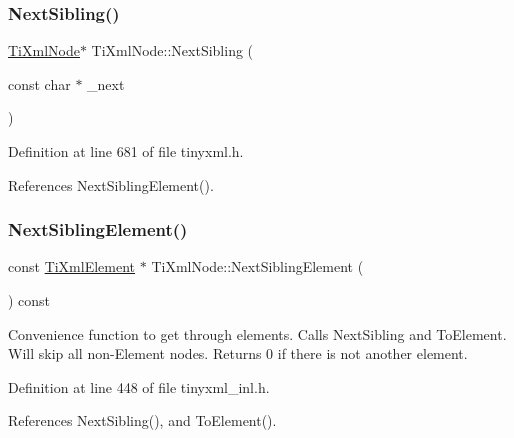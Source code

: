 \hypertarget{class_ti_xml_node_a4080bc5cc8a5c139e7cf308669e850fc}{}\label{class_ti_xml_node_a4080bc5cc8a5c139e7cf308669e850fc} 
\subsubsection{\texorpdfstring{Next\+Sibling()}{NextSibling()}\hspace{0.1cm}{\footnotesize\ttfamily [6/6]}}
{\footnotesize\ttfamily \hyperlink{class_ti_xml_node}{Ti\+Xml\+Node}$\ast$ Ti\+Xml\+Node\+::\+Next\+Sibling (\begin{DoxyParamCaption}\item[{const char $\ast$}]{\+\_\+next }\end{DoxyParamCaption})\hspace{0.3cm}{\ttfamily [inline]}}



Definition at line 681 of file tinyxml.\+h.



References Next\+Sibling\+Element().

\hypertarget{class_ti_xml_node_ac6105781c913a42aa7f3f17bd1964f7c}{}\label{class_ti_xml_node_ac6105781c913a42aa7f3f17bd1964f7c} 
\subsubsection{\texorpdfstring{Next\+Sibling\+Element()}{NextSiblingElement()}\hspace{0.1cm}{\footnotesize\ttfamily [1/6]}}
{\footnotesize\ttfamily const \hyperlink{class_ti_xml_element}{Ti\+Xml\+Element} $\ast$ Ti\+Xml\+Node\+::\+Next\+Sibling\+Element (\begin{DoxyParamCaption}{ }\end{DoxyParamCaption}) const}

Convenience function to get through elements. Calls Next\+Sibling and To\+Element. Will skip all non-\/\+Element nodes. Returns 0 if there is not another element. 

Definition at line 448 of file tinyxml\+\_\+inl.\+h.



References Next\+Sibling(), and To\+Element().



